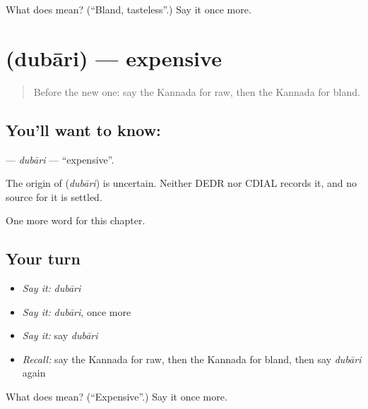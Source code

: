 \begin{tcolorbox}[breakable,colback=teal!4,colframe=teal!35!black,title={Before you move on}]
What does  mean? (\textquotedblleft{}Bland, tasteless\textquotedblright{}.) Say it once more.
\end{tcolorbox}
\section[\texorpdfstring{\kn{ದುಬಾರಿ} (dubāri)}{ದುಬಾರಿ (dubāri)}]{ (dubāri) — expensive}

\label{lesson:KA-C179-dubari}



\begin{quote}
Before the new one: say the Kannada for raw, then the Kannada for bland.
\end{quote}

\subsection*{You'll want to know: }
\textbf{} — \emph{dubāri} — \textquotedblleft{}expensive\textquotedblright{}.

\begin{cousinweb}
The origin of \textbf{} (\emph{dubāri}) is uncertain. Neither DEDR nor CDIAL records it, and no source for it is settled.
\end{cousinweb}

\begin{grammarlens}[title={What you've built}]
One more word for this chapter.
\end{grammarlens}

\subsection*{Your turn}
\begin{itemize}
\raggedright
  \item \emph{Say it:} \emph{dubāri}
  \item \emph{Say it:} \emph{dubāri}, once more
  \item \emph{Say it:} say \emph{dubāri}
  \item \emph{Recall:} say the Kannada for raw, then the Kannada for bland, then say \emph{dubāri} again
\end{itemize}

\begin{tcolorbox}[breakable,colback=teal!4,colframe=teal!35!black,title={Before you move on}]
What does  mean? (\textquotedblleft{}Expensive\textquotedblright{}.) Say it once more.
\end{tcolorbox}
